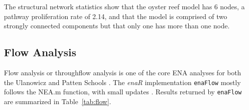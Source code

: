 \documentclass[article]{jss}
\begin{document}
The structural network statistics show that the oyster reef model has
6 nodes, a pathway proliferation rate of 2.14, and that the model is
comprised of two strongly connected components but that only one has
more than one node.

\subsection{Flow Analysis}
Flow analysis or throughflow analysis is one of the core ENA analyses
for both the Ulanowicz and Patten Schools \citep{fath99_review,
  fath06, schramski11}.  The \textit{enaR} implementation
\texttt{enaFlow} mostly follows the NEA.m function, with small updates
\cite[e.g. calculating the ratio of indirect-to-direct
flows][]{borrett11_ree,borrett11_equ}. Results returned by
\texttt{enaFlow} are summarized in Table~\ref{tab:flow}.
\end{document}
